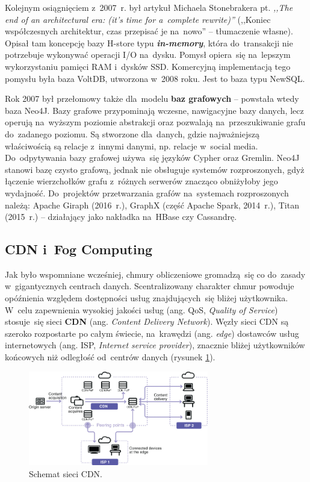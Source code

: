 \documentclass[12pt,a4paper,twoside,titlepage,openright]{book}
\begin{document}
Kolejnym osiągnięciem z~2007~r. był artykuł Michaela Stonebrakera pt. \textit{,,The end of an architectural era: (it's time for a~complete rewrite)''} (,,Koniec współczesnych architektur, czas przepisać je na~nowo'' -- tłumaczenie własne). Opisał tam koncepcję bazy H-store typu \textit{\textbf{in-memory}}, która do~transakcji nie potrzebuje wykonywać operacji I/O na~dysku. Pomysł opiera~się na~lepszym wykorzystaniu pamięci RAM i~dysków SSD. Komercyjną implementacją tego pomysłu była baza VoltDB, utworzona w~2008 roku. Jest to baza typu NewSQL.

Rok 2007 był przełomowy także dla~modelu \textbf{baz grafowych} -- powstała wtedy baza Neo4J. Bazy grafowe przypominają wczesne, nawigacyjne bazy danych, lecz operują na~wyższym poziomie abstrakcji oraz pozwalają na~przeszukiwanie grafu do~zadanego poziomu. Są stworzone dla~danych, gdzie najważniejszą właściwością są relacje z~innymi danymi, np. relacje w~social media. Do~odpytywania bazy grafowej używa~się języków Cypher oraz Gremlin. Neo4J stanowi bazę czysto grafową, jednak nie obsługuje systemów rozproszonych, gdyż łączenie wierzchołków grafu z~różnych serwerów znacząco obniżyłoby jego wydajność. Do~projektów przetwarzania grafów na~systemach rozproszonych należą: Apache Giraph (2016~r.), GraphX (część Apache Spark, 2014~r.), Titan (2015~r.) -- działający jako nakładka na~HBase czy Cassandrę.


\subsection{CDN i~Fog Computing} \label{section:fog}

Jak było wspomniane wcześniej, chmury obliczeniowe gromadzą~się co do~zasady w~gigantycznych centrach danych. Scentralizowany charakter chmur powoduje opóźnienia względem dostępności usług znajdujących~się bliżej użytkownika. W~celu zapewnienia wysokiej jakości usług (ang. QoS, \textit{Quality of Service}) stosuje~się sieci \textbf{CDN} (ang. \textit{Content Delivery Network}). Węzły sieci CDN są szeroko rozpostarte po całym świecie, na~krawędzi (ang. \textit{edge}) dostawców usług internetowych (ang. ISP, \textit{Internet service provider}), znacznie bliżej użytkowników końcowych niż odległość od~centrów danych (rysunek \ref{fig:cdn-schemat}). \cite{cdn}

\begin{figure}[h]
	\centering
			\includegraphics[width=0.7\textwidth]{cdn-schemat.jpg}
		\caption{Schemat sieci CDN. \cite{cdn}}
		\label{fig:cdn-schemat}
\end{figure}
\end{document}
